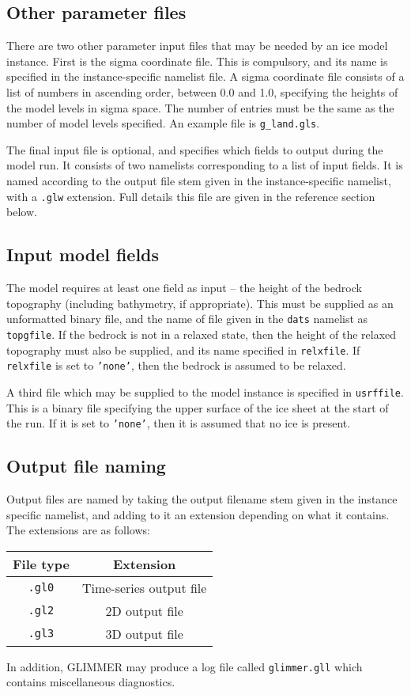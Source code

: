 \subsection{Other parameter files}
%
There are two other parameter input files that may be needed by an ice model instance. First
is the sigma coordinate file. This is compulsory, and its name is specified in
the instance-specific namelist file. A sigma coordinate file consists of a
list of numbers in ascending order, between 0.0 and 1.0, specifying the
heights of the model levels in sigma space. The number of entries must be the
same as the number of model levels specified. An example file is
\texttt{g\_land.gls}.

The final input file is optional, and specifies which fields to output during
the model run. It consists of two namelists corresponding to a list of input
fields. It is named according to the output file stem given in the
instance-specific namelist, with a \texttt{.glw} extension. Full details this
file are given in the reference section below.
%
\subsection{Input model fields}
%
The model requires at least one field as input -- the height of the bedrock
topography (including bathymetry, if appropriate). This must be supplied as an
unformatted binary file, and the name of file given in the \texttt{dats}
namelist as \texttt{topgfile}. If the bedrock is not in a relaxed state, then
the height of the relaxed topography must also be supplied, and its name
specified in \texttt{relxfile}. If \texttt{relxfile} is set to \texttt{'none'},
then the bedrock is assumed to be relaxed.

A third file which may be supplied to the model instance is specified in
\texttt{usrffile}. This is a binary file specifying the upper surface of the
ice sheet at the start of the run. If it is set to \texttt{'none'}, then it is
assumed that no ice is present.
%
\subsection{Output file naming}
%
Output files are named by taking the output filename stem given in the
instance specific namelist, and adding to it an extension depending on what it
contains. The extensions are as follows:
%
\begin{center}
\begin{tabular}{|c|c|}
\hline
File type & Extension \\
\hline
\hline
\texttt{.gl0} & Time-series output file \\
\hline
\texttt{.gl2} & 2D output file \\
\hline
\texttt{.gl3} & 3D output file \\
\hline
\end{tabular}
\end{center}
%
In addition, GLIMMER may produce a log file called \texttt{glimmer.gll} which
contains miscellaneous diagnostics.
%
